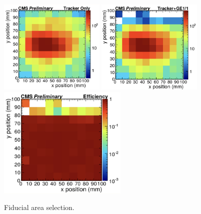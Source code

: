 \begin{figure}[htbp]
    \centering
    \includegraphics[width=0.45\textwidth]{figures/GEM/FiducialAreaCal_TrackerOnly.jpeg}%
    \includegraphics[width=0.45\textwidth]{figures/GEM/FiducialAreaCal_TrackerGE11.jpeg}\\
    \includegraphics[width=0.55\textwidth]{figures/GEM/FiducialAreaCal_Selection.jpeg}\\
    \caption{Fiducial area selection.}
    \label{fig:fiducial_area_sel}
\end{figure}
